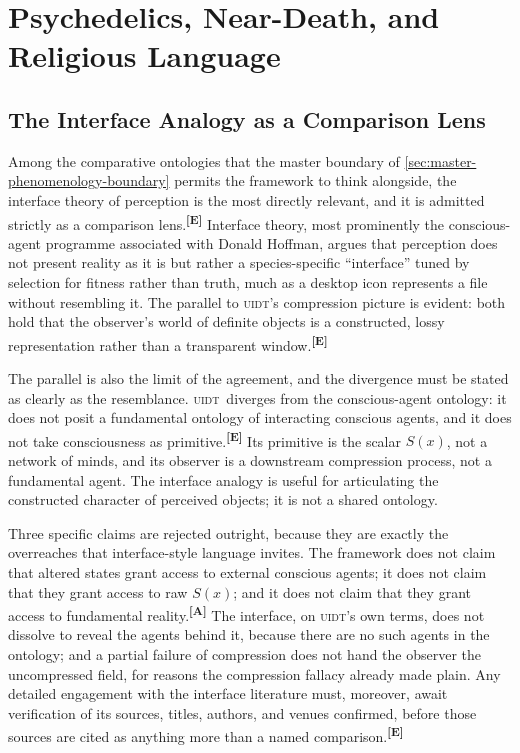 \documentclass[12pt,a4paper,twoside]{article}
\theoremstyle{plain}
\theoremstyle{definition}
\theoremstyle{remark}
\newcommand{\UIDT}{\textsc{uidt}}
\newcommand{\catmark}[1]{\textsuperscript{\textsf{\textbf{[#1]}}}}
\begin{document}
\section{Psychedelics, Near-Death, and Religious Language}
\label{sec:dmt-nde-mysticism}

\subsection{The Interface Analogy as a Comparison Lens}
\label{subsec:interface-analogy}

Among the comparative ontologies that the master boundary of \cref{sec:master-phenomenology-boundary} permits the framework to think alongside, the interface theory of perception is the most directly relevant, and it is admitted strictly as a comparison lens.\catmark{E} Interface theory, most prominently the conscious-agent programme associated with Donald Hoffman, argues that perception does not present reality as it is but rather a species-specific ``interface'' tuned by selection for fitness rather than truth, much as a desktop icon represents a file without resembling it. The parallel to \UIDT's compression picture is evident: both hold that the observer's world of definite objects is a constructed, lossy representation rather than a transparent window.\catmark{E}

The parallel is also the limit of the agreement, and the divergence must be stated as clearly as the resemblance. \UIDT\ diverges from the conscious-agent ontology: it does not posit a fundamental ontology of interacting conscious agents, and it does not take consciousness as primitive.\catmark{E} Its primitive is the scalar $S(x)$, not a network of minds, and its observer is a downstream compression process, not a fundamental agent. The interface analogy is useful for articulating the constructed character of perceived objects; it is not a shared ontology.

Three specific claims are rejected outright, because they are exactly the overreaches that interface-style language invites. The framework does not claim that altered states grant access to external conscious agents; it does not claim that they grant access to raw $S(x)$; and it does not claim that they grant access to fundamental reality.\catmark{A} The interface, on \UIDT's own terms, does not dissolve to reveal the agents behind it, because there are no such agents in the ontology; and a partial failure of compression does not hand the observer the uncompressed field, for reasons the compression fallacy already made plain. Any detailed engagement with the interface literature must, moreover, await verification of its sources, titles, authors, and venues confirmed, before those sources are cited as anything more than a named comparison.\catmark{E}
\end{document}
